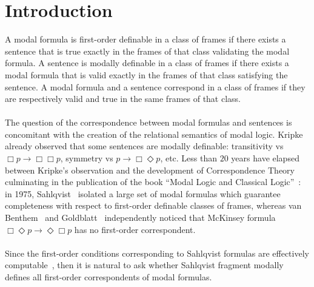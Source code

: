\documentclass[draft]{article}
\begin{document}
\section{Introduction}\label{section:introduction}
%
%
A modal formula is first-order definable in a class of frames if there exists a sentence that is true exactly in the frames of that class validating the modal formula.
A sentence is modally definable in a class of frames if there exists a modal formula that is valid exactly in the frames of that class satisfying the sentence.
A modal formula and a sentence correspond in a class of frames if they are respectively valid and true in the same frames of that class.
%
%
\\
\\
%
%
The question of the correspondence between modal formulas and sentences is concomitant with the creation of the relational semantics of modal logic.
Kripke~\cite{Kripke:1963} already observed that some sentences are modally definable: transitivity vs $\Box p\rightarrow\Box\Box p$, symmetry vs $p\rightarrow\Box\Diamond p$, etc.
Less than $20$ years have elapsed between Kripke's observation and the development of Correspondence Theory culminating in the publication of the book ``Modal Logic and Classical Logic''~\cite{vanBenthem:1983}: in 1975, Sahlqvist~\cite{Sahlqvist:1975} isolated a large set of modal formulas which guarantee completeness with respect to first-order definable classes of frames, whereas van Benthem~\cite{vanBenthem:1975} and Goldblatt~\cite{Goldblatt:1975} independently noticed that McKinsey formula $\Box\Diamond p\rightarrow\Diamond\Box p$ has no first-order correspondent.
%
%
\\
\\
%
%
Since the first-order conditions corresponding to Sahlqvist formulas are effectively computable~\cite{Sahlqvist:1975}, then it is natural to ask whether Sahlqvist fragment modally defines all first-order correspondents of modal formulas.
\end{document}
